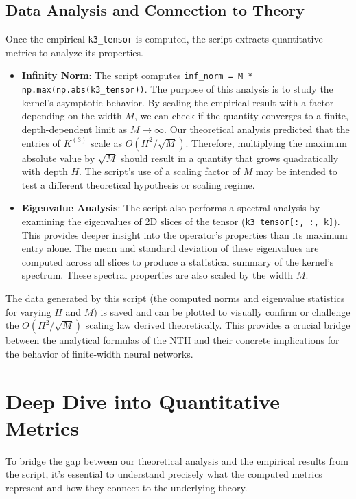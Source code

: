 \documentclass[11pt,a4paper]{article}
\begin{document}
\subsection{Data Analysis and Connection to Theory}

Once the empirical \texttt{k3\_tensor} is computed, the script extracts quantitative metrics to analyze its properties.

\begin{itemize}
    \item \textbf{Infinity Norm}: The script computes \texttt{inf\_norm = M * np.max(np.abs(k3\_tensor))}. The purpose of this analysis is to study the kernel's asymptotic behavior. By scaling the empirical result with a factor depending on the width $M$, we can check if the quantity converges to a finite, depth-dependent limit as $M \to \infty$. Our theoretical analysis predicted that the entries of $K^{(3)}$ scale as $O(H^2/\sqrt{M})$. Therefore, multiplying the maximum absolute value by $\sqrt{M}$ should result in a quantity that grows quadratically with depth $H$. The script's use of a scaling factor of $M$ may be intended to test a different theoretical hypothesis or scaling regime.

    \item \textbf{Eigenvalue Analysis}: The script also performs a spectral analysis by examining the eigenvalues of 2D slices of the tensor (\texttt{k3\_tensor[:, :, k]}). This provides deeper insight into the operator's properties than its maximum entry alone. The mean and standard deviation of these eigenvalues are computed across all slices to produce a statistical summary of the kernel's spectrum. These spectral properties are also scaled by the width $M$.
\end{itemize}

The data generated by this script (the computed norms and eigenvalue statistics for varying $H$ and $M$) is saved and can be plotted to visually confirm or challenge the $O(H^2/\sqrt{M})$ scaling law derived theoretically. This provides a crucial bridge between the analytical formulas of the NTH and their concrete implications for the behavior of finite-width neural networks.

\newpage

\section{Deep Dive into Quantitative Metrics}

To bridge the gap between our theoretical analysis and the empirical results from the script, it's essential to understand precisely what the computed metrics represent and how they connect to the underlying theory.
\end{document}
